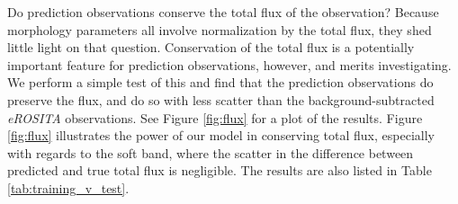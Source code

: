 \documentclass[twocolumn, 11pt]{aastex63}%
\begin{document}
Do prediction observations conserve the total flux of the observation? Because morphology parameters all involve normalization by the total flux, they shed little light on that question. Conservation of the total flux is a potentially important feature for prediction observations, however, and merits investigating. We perform a simple test of this and find that the prediction observations do preserve the flux, and do so with less scatter than the background-subtracted \textit{eROSITA} observations. See Figure \ref{fig:flux} for a plot of the results. Figure \ref{fig:flux} illustrates the power of our model in conserving total flux, especially with regards to the soft band, where the scatter in the difference between predicted and true total flux is negligible. The results are also listed in Table \ref{tab:training_v_test}.
\end{document}
